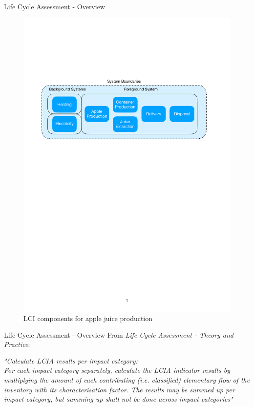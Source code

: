\begin{frame}{Life Cycle Assessment - Overview}
\begin{figure}
    \centering
    \includegraphics[width=1\linewidth]{.figures/InventoryComponents.pdf}
    \caption{LCI components for apple juice production}
\end{figure}
\end{frame}

\begin{frame}{Life Cycle Assessment - Overview}
From \textit{Life Cycle Assessment - Theory and Practice}:
\begin{center} \color{darkgray}
    \textit{"Calculate LCIA results per impact category:\\ 
    For each impact category separately, calculate the LCIA indicator results by multiplying the amount of each contributing (i.e. classified) elementary flow of the inventory with its characterisation factor. The results may be summed up per impact category, but summing up shall not be done across impact categories"}
\end{center}
\end{frame}

